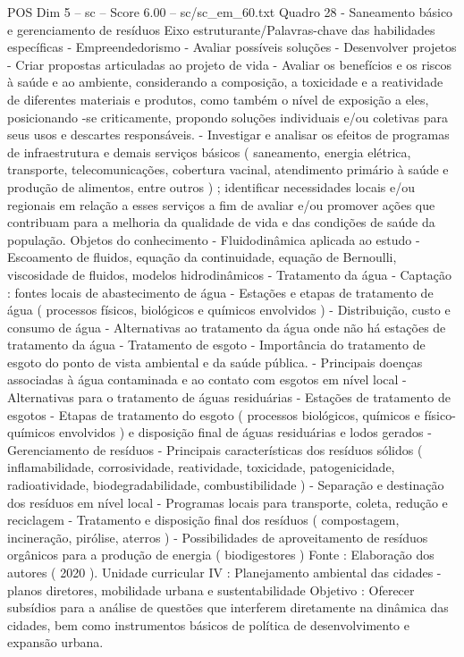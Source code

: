 \begin{textsample}{POS Dim 5 – sc – Score 6.00 – sc/sc\_em\_60.txt}
Quadro 28 - Saneamento básico e gerenciamento de resíduos Eixo estruturante/Palavras-chave das habilidades específicas - Empreendedorismo - Avaliar possíveis soluções - Desenvolver projetos - Criar propostas articuladas ao projeto de vida - Avaliar os benefícios e os riscos à saúde e ao ambiente, considerando a composição, a toxicidade e a reatividade de diferentes materiais e produtos, como também o nível de exposição a eles, posicionando -se criticamente, propondo soluções individuais e/ou coletivas para seus usos e descartes responsáveis. - Investigar e analisar os efeitos de programas de infraestrutura e demais serviços básicos ( saneamento, energia elétrica, transporte, telecomunicações, cobertura vacinal, atendimento primário à saúde e produção de alimentos, entre outros ) ; identificar necessidades locais e/ou regionais em relação a esses serviços a fim de avaliar e/ou promover ações que contribuam para a melhoria da qualidade de vida e das condições de saúde da população.
Objetos do conhecimento - Fluidodinâmica aplicada ao estudo - Escoamento de fluidos, equação da continuidade, equação de Bernoulli, viscosidade de fluidos, modelos hidrodinâmicos - Tratamento da água - Captação : fontes locais de abastecimento de água - Estações e etapas de tratamento de água ( processos físicos, biológicos e químicos envolvidos ) - Distribuição, custo e consumo de água - Alternativas ao tratamento da água onde não há estações de tratamento da água - Tratamento de esgoto - Importância do tratamento de esgoto do ponto de vista ambiental e da saúde pública. - Principais doenças associadas à água contaminada e ao contato com esgotos em nível local - Alternativas para o tratamento de águas residuárias - Estações de tratamento de esgotos - Etapas de tratamento do esgoto ( processos biológicos, químicos e físico-químicos envolvidos ) e disposição final de águas residuárias e lodos gerados - Gerenciamento de resíduos - Principais características dos resíduos sólidos ( inflamabilidade, corrosividade, reatividade, toxicidade, patogenicidade, radioatividade, biodegradabilidade, combustibilidade ) - Separação e destinação dos resíduos em nível local - Programas locais para transporte, coleta, redução e reciclagem - Tratamento e disposição final dos resíduos ( compostagem, incineração, pirólise, aterros ) - Possibilidades de aproveitamento de resíduos orgânicos para a produção de energia ( biodigestores ) Fonte : Elaboração dos autores ( 2020 ).
Unidade curricular IV : Planejamento ambiental das cidades - planos diretores, mobilidade urbana e sustentabilidade Objetivo : Oferecer subsídios para a análise de questões que interferem diretamente na dinâmica das cidades, bem como instrumentos básicos de política de desenvolvimento e expansão urbana.

\end{textsample}
